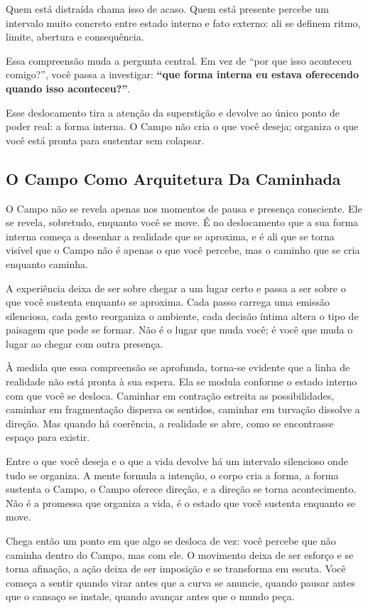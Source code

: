 \documentclass[12pt]{book}
\begin{document}
Quem está distraída chama isso de acaso. Quem está presente percebe um intervalo muito concreto entre estado interno e fato externo: ali se definem ritmo, limite, abertura e consequência.

Essa compreensão muda a pergunta central. Em vez de \enquote{por que isso aconteceu comigo?}, você passa a investigar: \textbf{\enquote{que forma interna eu estava oferecendo quando isso aconteceu?}}.

Esse deslocamento tira a atenção da superstição e devolve ao único ponto de poder real: a forma interna. O Campo não cria o que você deseja; organiza o que você está pronta para sustentar sem colapsar.

\subsection*{O Campo Como Arquitetura Da Caminhada}

O Campo não se revela apenas nos momentos de pausa e presença consciente. Ele se revela, sobretudo, enquanto você se move. É no deslocamento que a sua forma interna começa a desenhar a realidade que se aproxima, e é ali que se torna visível que o Campo não é apenas o que você percebe, mas o caminho que se cria enquanto caminha.

A experiência deixa de ser sobre chegar a um lugar certo e passa a ser sobre o que você sustenta enquanto se aproxima. Cada passo carrega uma emissão silenciosa, cada gesto reorganiza o ambiente, cada decisão íntima altera o tipo de paisagem que pode se formar. Não é o lugar que muda você; é você que muda o lugar ao chegar com outra presença.

À medida que essa compreensão se aprofunda, torna-se evidente que a linha de realidade não está pronta à sua espera. Ela se modula conforme o estado interno com que você se desloca. Caminhar em contração estreita as possibilidades, caminhar em fragmentação dispersa os sentidos, caminhar em turvação dissolve a direção. Mas quando há coerência, a realidade se abre, como se encontrasse espaço para existir.

Entre o que você deseja e o que a vida devolve há um intervalo silencioso onde tudo se organiza. A mente formula a intenção, o corpo cria a forma, a forma sustenta o Campo, o Campo oferece direção, e a direção se torna acontecimento. Não é a promessa que organiza a vida, é o estado que você sustenta enquanto se move.

Chega então um ponto em que algo se desloca de vez: você percebe que não caminha dentro do Campo, mas com ele. O movimento deixa de ser esforço e se torna afinação, a ação deixa de ser imposição e se transforma em escuta. Você começa a sentir quando virar antes que a curva se anuncie, quando pausar antes que o cansaço se instale, quando avançar antes que o mundo peça.
\end{document}

